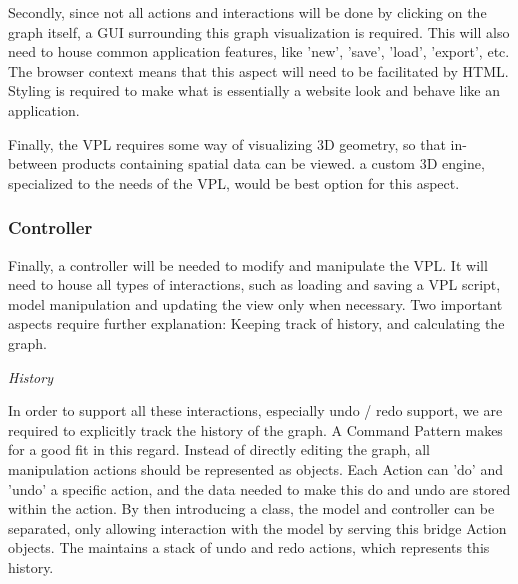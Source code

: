 Secondly, since not all actions and interactions will be done by clicking on the graph itself, a \ac{GUI} surrounding this graph visualization is required.
This will also need to house common application features, like 'new', 'save', 'load', 'export', etc.  
The browser context means that this aspect will need to be facilitated by HTML. 
Styling is required to make what is essentially a website look and behave like an application. 

Finally, the VPL requires some way of visualizing 3D geometry, so that in-between products containing spatial data can be viewed. 
a custom 3D engine, specialized to the needs of the VPL, would be best option for this aspect.

\subsubsection*{Controller}
\label{sec:method-controller}

Finally, a controller will be needed to modify and manipulate the VPL.
It will need to house all types of interactions, such as loading and saving a VPL script, model manipulation and updating the view only when necessary.
Two important aspects require further explanation: Keeping track of history, and calculating the graph. 

\emph{History}

In order to support all these interactions, especially undo / redo support, we are required to explicitly track the history of the graph. 
A Command Pattern \citep{gamma_design_1994} makes for a good fit in this regard.
Instead of directly editing the graph, all manipulation actions should be represented as  objects. 
Each Action can 'do' and 'undo' a specific action, and the data needed to make this do and undo are stored within the action. 
By then introducing a  class, the model and controller can be separated, only allowing interaction with the model by serving this bridge Action objects. The  maintains a stack of undo and redo actions, which represents this history.  


